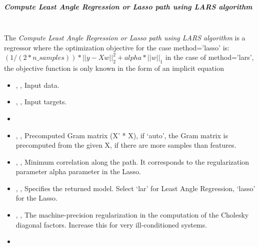 \subparagraph{Compute Least Angle Regression or Lasso path using LARS algorithm}
\mbox{}
\\The \textit{Compute Least Angle Regression or Lasso path using LARS algorithm}
is a regressor where the optimization objective for the case method=’lasso’
is:
$(1 / (2 * n\_samples)) * ||y - Xw||^2_2 + alpha * ||w||_1$
in the case of method=’lars’, the objective function is only known in the
form of an implicit equation
\begin{itemize}
  \item {} , ,
  Input data.
  \item {} , ,
  Input targets.
  \item {}
  \item {} , ,
  Precomputed Gram matrix (X’ * X), if `auto', the Gram matrix is precomputed
  from the given X, if there are more samples than features.
  \item {} , ,
  Minimum correlation along the path.
  It corresponds to the regularization parameter alpha parameter in the Lasso.
  \item {} , ,
  Specifies the returned model.
  Select `lar' for Least Angle Regression, `lasso' for the Lasso.
  \item {} , ,
  The machine-precision regularization in the computation of the Cholesky
  diagonal factors.
  Increase this for very ill-conditioned systems.
  \item \verDescriptionB
\end{itemize}

